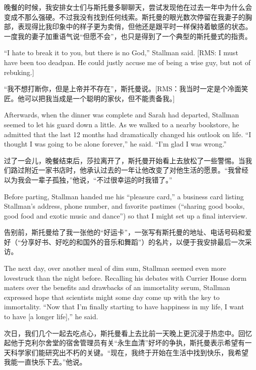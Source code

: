 \ifdefined\chs
晚餐的时候，我安排女士们与斯托曼多聊聊天，尝试发现他在过去一年中为什么会变成不那么强硬。不过我没有找到任何线索。斯托曼的眼光数次停留在我妻子的胸部，表现得比我印象中的样子更为卖俏，但他还是跟平时一样保持着敏感的状态。一度我的妻子加重语气说“但愿不会”，也只是得到了一个典型的斯托曼式的指责。
\fi

\ifdefined\eng
``I hate to break it to you, but there is no God,'' Stallman said. [RMS: I must have been too deadpan. He could justly accuse me of being a wise guy, but not of rebuking.]
\fi

\ifdefined\chs
“我不想打断你，但是上帝并不存在”，斯托曼说。[RMS：我当时一定是个冷面笑匠。他可以把我当成是一个聪明的家伙，但不能责备我。]
\fi

\ifdefined\eng
Afterwards, when the dinner was complete and Sarah had departed, Stallman seemed to let his guard down a little. As we walked to a nearby bookstore, he admitted that the last 12 months had dramatically changed his outlook on life. ``I thought I was going to be alone forever,'' he said. ``I'm glad I was wrong.''
\fi

\ifdefined\chs
过了一会儿，晚餐结束后，莎拉离开了，斯托曼开始看上去放松了一些警惕。当我们路过附近一家书店时，他承认过去的一年让他改变了对他生活的愿景。“我曾经以为我会一辈子孤独，”他说，“不过很幸运的时我错了。”
\fi

\ifdefined\eng
Before parting, Stallman handed me his ``pleasure card,'' a business card listing Stallman's address, phone number, and favorite pastimes (``sharing good books, good food and exotic music and dance'') so that I might set up a final interview.
\fi

\ifdefined\chs
告别前，斯托曼给了我一张他的“好运卡”，一张写有斯托曼的地址、电话号码和爱好（“分享好书、好吃的和国外的音乐和舞蹈”）的名片，以便于我安排最后一次采访。
\fi

\ifdefined\eng
The next day, over another meal of dim sum, Stallman seemed even more lovestruck than the night before. Recalling his debates with Currier House dorm maters over the benefits and drawbacks of an immortality serum, Stallman expressed hope that scientists might some day come up with the key to immortality. ``Now that I'm finally starting to have happiness in my life, I want to have [a longer life],'' he said.
\fi

\ifdefined\chs
次日，我们几个一起去吃点心，斯托曼看上去比前一天晚上更沉浸于热恋中。回忆起他于克利尔舍堂的宿舍管理员有关“永生血清”好坏的争执，斯托曼表示希望有一天科学家们能研究出不朽的关键。“现在，我终于开始在生活中找到快乐，我希望我能一直快乐下去。”他说。
\fi

